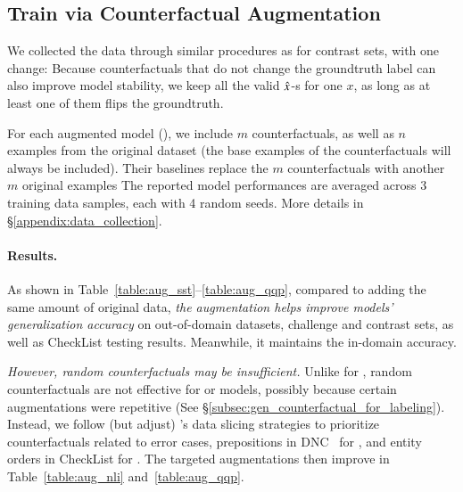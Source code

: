 \subsection{Train via Counterfactual Augmentation}
\label{subsec:augmentation}
We collected the data through similar procedures as for contrast sets, with one change:
Because counterfactuals that do not change the groundtruth label can also improve model stability, we keep all the valid $\hat{x}$-s for one $x$, as long as at least one of them flips the groundtruth.

For each augmented model (\maug), we include $m$ counterfactuals, as well as $n$ examples from the original dataset (the base examples of the counterfactuals will always be included).
Their baselines \mcomp replace the $m$ counterfactuals with another $m$ original examples
The reported model performances are averaged across 3 training data samples, each with 4 random seeds. More details in \S\ref{appendix:data_collection}.

\paragraph{Results.}
As shown in Table~\ref{table:aug_sst}--\ref{table:aug_qqp}, compared to adding the same amount of original data, \emph{the augmentation helps improve models' generalization accuracy} on out-of-domain datasets, challenge and contrast sets, as well as CheckList testing results.
Meanwhile, it maintains the in-domain accuracy.

\TableAugQQP


\emph{However, random counterfactuals may be insufficient.}
Unlike for \sst, random counterfactuals are not effective for \nli or \qqp models, possibly because certain augmentations were repetitive (See \S\ref{subsec:gen_counterfactual_for_labeling}).
Instead, we follow (but adjust) \citet{chen2019slice}'s data slicing strategies to prioritize counterfactuals related to error cases, \eg prepositions in DNC~\cite{kim2019probing} for \nli, and entity orders in CheckList for \qqp.
The targeted augmentations then improve \maug in Table~\ref{table:aug_nli} and~\ref{table:aug_qqp}.

